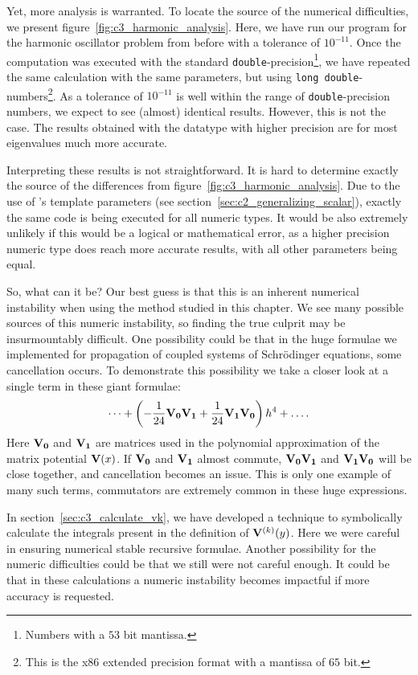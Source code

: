 Yet, more analysis is warranted. To locate the source of the numerical difficulties, we present figure~\ref{fig:c3_harmonic_analysis}. Here, we have run our program  for the harmonic oscillator problem from before with a tolerance of $10^{-11}$. Once the computation was executed with the standard \texttt{double}-precision\footnote{Numbers with a $53$ bit mantissa.}, we have repeated the same calculation with the same parameters, but using \texttt{long double}-numbers\footnote{This is the x86 extended precision format with a mantissa of $65$ bit.}. As a tolerance of $10^{-11}$ is well within the range of \texttt{double}-precision numbers, we expect to see (almost) identical results. However, this is not the case. The results obtained with the datatype with higher precision are for most eigenvalues much more accurate.

Interpreting these results is not straightforward. It is hard to determine exactly the source of the differences from figure~\ref{fig:c3_harmonic_analysis}. Due to the use of \cpp{}'s template parameters (see section~\ref{sec:c2_generalizing_scalar}), exactly the same code is being executed for all numeric types. It would be also extremely unlikely if this would be a logical or mathematical error, as a higher precision numeric type does reach more accurate results, with all other parameters being equal.

So, what can it be? Our best guess is that this is an inherent numerical instability when using the method studied in this chapter. We see many possible sources of this numeric instability, so finding the true culprit may be insurmountably difficult. One possibility could be that in the huge formulae we implemented for propagation of coupled systems of Schrödinger equations, some cancellation occurs. To demonstrate this possibility we take a closer look at a single term in these giant formulae:
$$
  \dots + \left(-\frac{1}{24}\vb{V_0}\vb{V_1} + \frac{1}{24} \vb{V_1}\vb{V_0}\right) h^4 + \dots \text{.}
$$
Here $\vb{V_0}$ and $\vb{V_1}$ are matrices used in the polynomial approximation of the matrix potential $\vb{V}(x)$. If $\vb{V_0}$ and $\vb{V_1}$ almost commute, $\vb{V_0}\vb{V_1}$ and $\vb{V_1}\vb{V_0}$ will be close together, and cancellation becomes an issue. This is only one example of many such terms, commutators are extremely common in these huge expressions.

In section~\ref{sec:c3_calculate_vk}, we have developed a technique to symbolically calculate the integrals present in the definition of $\vb{V}^{(k)}(y)$. Here we were careful in ensuring numerical stable recursive formulae. Another possibility for the numeric difficulties could be that we still were not careful enough. It could be that in these calculations a numeric instability becomes impactful if more accuracy is requested.

